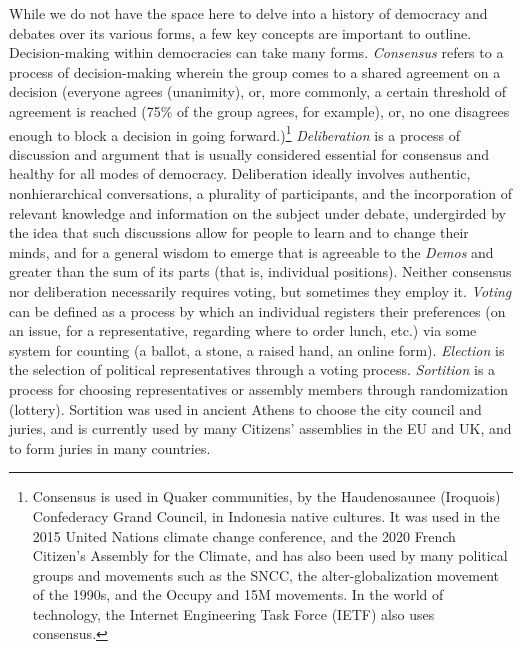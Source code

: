 While we do not have the space here to delve into a history of democracy and
debates over its various forms, a few key concepts are important to outline.
Decision-making within democracies can take many forms. \textit{Consensus} refers to a
process of decision-making wherein the group comes to a shared agreement on a
decision (everyone agrees (unanimity), or, more commonly, a certain threshold of
agreement is reached (75\% of the group agrees, for example), or, no one
disagrees enough to block a decision in going forward.)\footnote{Consensus is
used in Quaker communities, by the Haudenosaunee (Iroquois) Confederacy Grand
Council, in Indonesia native cultures. It was used in the 2015 United Nations
climate change conference, and the 2020 French Citizen’s Assembly for the
Climate, and has also been used by many political groups and movements such as
the SNCC, the alter-globalization movement of the 1990s, and the Occupy and 15M
movements. In the world of technology, the Internet Engineering Task Force
(IETF) also uses consensus.} \textit{Deliberation} is a process of discussion
and argument that is usually considered essential for consensus and healthy for
all modes of democracy. Deliberation ideally involves authentic, nonhierarchical
conversations, a plurality of participants, and the incorporation of relevant
knowledge and information on the subject under debate, undergirded by the idea
that such discussions allow for people to learn and to change their minds, and for a
general wisdom to emerge that is agreeable to the \textit{Demos} and greater
than the sum of its parts (that is, individual positions). Neither consensus nor
deliberation necessarily requires voting, but sometimes they employ it.
\textit{Voting} can be defined as a process by which an individual registers
their preferences (on an issue, for a representative, regarding where to order
lunch, etc.) via some system for counting (a ballot, a stone, a raised hand, an
online form). \textit{Election} is the selection of political representatives
through a voting process. \textit{Sortition} is a process for choosing
representatives or assembly members through randomization (lottery). Sortition
was used in ancient Athens to choose the city council and juries, and is
currently used by many Citizens’ assemblies in the EU and UK, and to form juries
in many countries.

